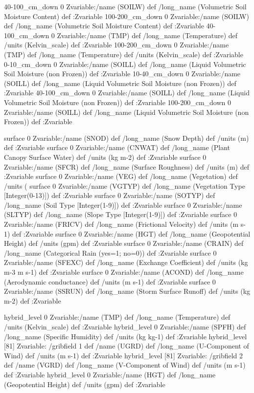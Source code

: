 \begin{ingrid}

40-100_cm_down 0 Zvariable:/name (SOILW) def /long_name (Volumetric Soil Moisture Content) def :Zvariable
100-200_cm_down 0 Zvariable:/name (SOILW) def /long_name (Volumetric Soil Moisture Content) def :Zvariable
40-100_cm_down 0 Zvariable:/name (TMP) def /long_name (Temperature) def /units (Kelvin_scale) def :Zvariable
100-200_cm_down 0 Zvariable:/name (TMP) def /long_name (Temperature) def /units (Kelvin_scale) def :Zvariable
0-10_cm_down 0 Zvariable:/name (SOILL) def /long_name (Liquid Volumetric Soil Moisture (non Frozen)) def :Zvariable
10-40_cm_down 0 Zvariable:/name (SOILL) def /long_name (Liquid Volumetric Soil Moisture (non Frozen)) def :Zvariable
40-100_cm_down 0 Zvariable:/name (SOILL) def /long_name (Liquid Volumetric Soil Moisture (non Frozen)) def :Zvariable
100-200_cm_down 0 Zvariable:/name (SOILL) def /long_name (Liquid Volumetric Soil Moisture (non Frozen)) def :Zvariable

\end{ingrid}
\begin{ingrid}

surface 0 Zvariable:/name (SNOD) def /long_name (Snow Depth) def /units (m) def :Zvariable
surface 0 Zvariable:/name (CNWAT) def /long_name (Plant Canopy Surface Water) def /units (kg m-2) def :Zvariable
surface 0 Zvariable:/name (SFCR) def /long_name (Surface Roughness) def /units (m) def :Zvariable
surface 0 Zvariable:/name (VEG) def /long_name (Vegetation) def /units (%
surface 0 Zvariable:/name (VGTYP) def /long_name (Vegetation Type [Integer(0-13)]) def :Zvariable
surface 0 Zvariable:/name (SOTYP) def /long_name (Soil Type [Integer(1-9)]) def :Zvariable
surface 0 Zvariable:/name (SLTYP) def /long_name (Slope Type [Integer(1-9)]) def :Zvariable
surface 0 Zvariable:/name (FRICV) def /long_name (Frictional Velocity) def /units (m s-1) def :Zvariable
surface 0 Zvariable:/name (HGT) def /long_name (Geopotential Height) def /units (gpm) def :Zvariable
surface 0 Zvariable:/name (CRAIN) def /long_name (Categorical Rain (yes=1; no=0)) def :Zvariable
surface 0 Zvariable:/name (SFEXC) def /long_name (Exchange Coefficient) def /units (kg m-3 m s-1) def :Zvariable
surface 0 Zvariable:/name (ACOND) def /long_name (Aerodynamic conductance) def /units (m s-1) def :Zvariable
surface 0 Zvariable:/name (SSRUN) def /long_name (Storm Surface Runoff) def /units (kg m-2) def :Zvariable

\end{ingrid}
\begin{ingrid}

hybrid_level 0 Zvariable:/name (TMP) def /long_name (Temperature) def /units (Kelvin_scale) def :Zvariable
hybrid_level 0 Zvariable:/name (SPFH) def /long_name (Specific Humidity) def /units (kg kg-1) def :Zvariable
hybrid_level [81] Zvariable: /gribfield 1 def /name (UGRD) def /long_name (U-Component of Wind) def /units (m s-1) def :Zvariable
hybrid_level [81] Zvariable: /gribfield 2 def /name (VGRD) def /long_name (V-Component of Wind) def /units (m s-1) def :Zvariable
hybrid_level 0 Zvariable:/name (HGT) def /long_name (Geopotential Height) def /units (gpm) def :Zvariable

\end{ingrid}
